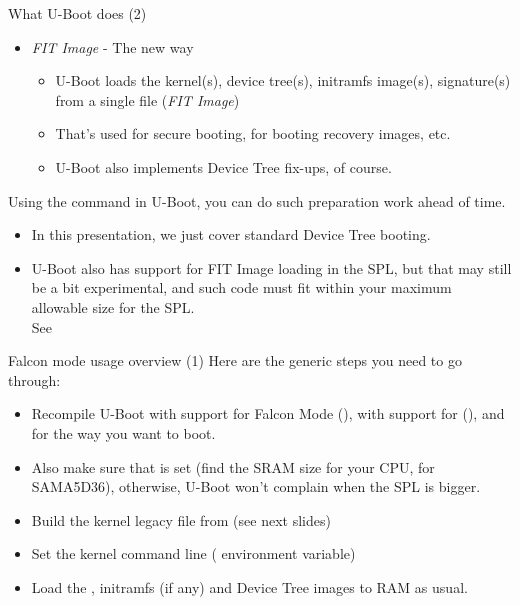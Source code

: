 \begin{frame}{What U-Boot does (2)}
  \begin{itemize}
    \item {\em FIT Image} - The new way
    \begin{itemize}
        \item U-Boot loads the kernel(s), device tree(s), initramfs
              image(s), signature(s) from a single file ({\em FIT Image})
        \item That's used for secure booting, for booting recovery
              images, etc.
        \item U-Boot also implements Device Tree fix-ups, of course.
    \end{itemize}
  \end{itemize}
  Using the  command in U-Boot, you can do such
  preparation work ahead of time.

  \begin{itemize}
     \item In this presentation, we just cover standard Device Tree
           booting.
     \item U-Boot also has support for FIT Image loading in the SPL, but
           that may still be a bit experimental, and such code must fit
           within your maximum allowable size for the SPL.\\
           See 
  \end{itemize}
\end{frame}

\begin{frame}{Falcon mode usage overview (1)}
   Here are the generic steps you need to go through:
   \begin{itemize}
     \item Recompile U-Boot with support for Falcon Mode
           (), with support
           for  (),
           and for the way you want to boot.
     \item Also make sure that  is
           set (find the SRAM size for your CPU,  for
           SAMA5D36), otherwise, U-Boot won't complain when the SPL
           is bigger.
     \item Build the kernel legacy  file from 
           (see next slides)
     \item Set the kernel command line ( environment variable)
     \item Load the , initramfs (if any) and Device Tree images
           to RAM as usual.
   \end{itemize}
\end{frame}


